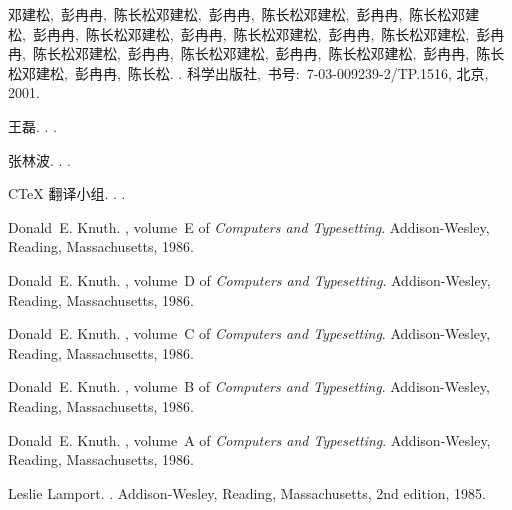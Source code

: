 \begin{thebibliography}{10}

{邓建松,~彭冉冉,~陈长松邓建松,~彭冉冉,~陈长松邓建松,~彭冉冉,~陈长松邓建松,~彭冉冉,~陈长松邓建松,~彭冉冉,~陈长松邓建松,~彭冉冉,~陈长松邓建松,~彭冉冉,~陈长松邓建松,~彭冉冉,~陈长松邓建松,~彭冉冉,~陈长松邓建松,~彭冉冉,~陈长松邓建松,~彭冉冉,~陈长松}.
.
\newblock 科学出版社,~书号:~7-03-009239-2/TP.1516, 北京, 2001.

王磊.
.
.

张林波.
.
.

C\TeX{} 翻译小组.
.
.

Donald~E. Knuth.
, volume~E of {\em Computers and
  Typesetting}.
\newblock Addison-Wesley, Reading, Massachusetts, 1986.

Donald~E. Knuth.
, volume~D of {\em Computers and
  Typesetting}.
\newblock Addison-Wesley, Reading, Massachusetts, 1986.

Donald~E. Knuth.
, volume~C of {\em Computers and
  Typesetting}.
\newblock Addison-Wesley, Reading, Massachusetts, 1986.

Donald~E. Knuth.
, volume~B of {\em Computers and
  Typesetting}.
\newblock Addison-Wesley, Reading, Massachusetts, 1986.

Donald~E. Knuth.
, volume~A of {\em Computers and Typesetting}.
\newblock Addison-Wesley, Reading, Massachusetts, 1986.

Leslie Lamport.
.
\newblock Addison-Wesley, Reading, Massachusetts, 2nd edition, 1985.


\end{thebibliography}
